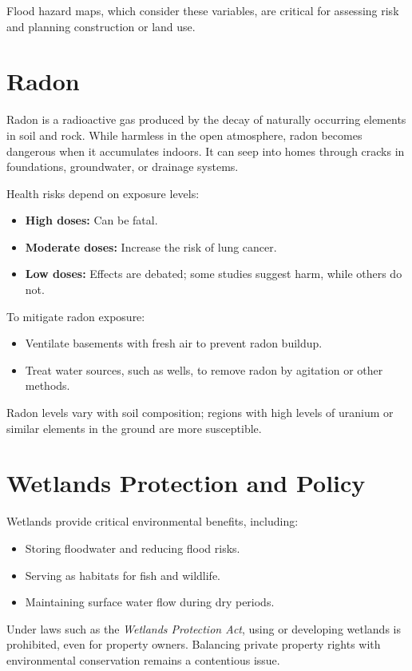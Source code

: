 \documentclass[12pt]{article}
\begin{document}
Flood hazard maps, which consider these variables, are critical for assessing risk and planning construction or land use.

\section{Radon}
Radon is a radioactive gas produced by the decay of naturally occurring elements in soil and rock. While harmless in the open atmosphere, radon becomes dangerous when it accumulates indoors. It can seep into homes through cracks in foundations, groundwater, or drainage systems.

Health risks depend on exposure levels:
\begin{itemize}
    \item \textbf{High doses:} Can be fatal.
    \item \textbf{Moderate doses:} Increase the risk of lung cancer.
    \item \textbf{Low doses:} Effects are debated; some studies suggest harm, while others do not.
\end{itemize}

To mitigate radon exposure:
\begin{itemize}
    \item Ventilate basements with fresh air to prevent radon buildup.
    \item Treat water sources, such as wells, to remove radon by agitation or other methods.
\end{itemize}

Radon levels vary with soil composition; regions with high levels of uranium or similar elements in the ground are more susceptible.

\section{Wetlands Protection and Policy}
Wetlands provide critical environmental benefits, including:
\begin{itemize}
    \item Storing floodwater and reducing flood risks.
    \item Serving as habitats for fish and wildlife.
    \item Maintaining surface water flow during dry periods.
\end{itemize}

Under laws such as the \textit{Wetlands Protection Act}, using or developing wetlands is prohibited, even for property owners. Balancing private property rights with environmental conservation remains a contentious issue.
\end{document}
